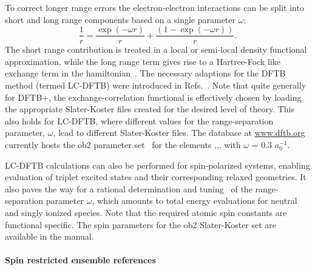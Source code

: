\documentclass[reprint,onecolumn,superscriptaddress]{revtex4-1}
\newcommand{\dftbp}{DFTB+}
\begin{document}
To correct longer range errors the electron-electron interactions can be split
into short and long range components based on a single parameter $\omega$:
\begin{equation}
  \label{range-sep}
  \frac{1}{r} = \frac{\exp(-\omega r)}{r} + \frac{\left(1- \exp(-\omega
    r)\right)}{r}.
\end{equation}
The short range contribution is treated in a local or semi-local density
functional approximation, while the long range term gives rise to a Hartree-Fock
like exchange term in the hamiltonian~\cite{Baer2010}. The necessary adaptions
for the DFTB method (termed LC-DFTB) were introduced in
Refs.~\cite{Niehaus2012,Lutsker2015}. Note that quite generally for \dftbp{},
the exchange-correlation functional is effectively chosen by loading the
appropriate Slater-Koster files created for the desired level of theory. This
also holds for LC-DFTB, where different values for the range-separation
parameter, $\omega$, lead to different Slater-Koster files. The database at
\url{www.dftb.org} currently hosts the ob2 parameter set~\cite{Vuong2019} for the elements
,,, with $\omega$ = 0.3 $a_0^{-1}$.

LC-DFTB calculations can also be performed for spin-polarized systems, enabling
evaluation of triplet excited states and their corresponding relaxed geometries.
It also paves the way for a rational determination and tuning~\cite{Baer2010} of
the range-separation parameter $\omega$, which amounts to total energy
evaluations for neutral and singly ionized species. Note that the required
atomic spin constants are functional specific. The spin parameters for the ob2
Slater-Koster set are available in the manual.


\paragraph{Spin restricted ensemble references}
\end{document}

